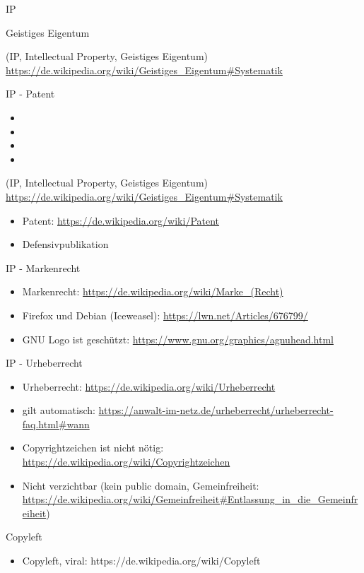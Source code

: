 \begin{frame}{IP}
	\begin{center}
		Geistiges Eigentum
	\end{center}
\end{frame}
\note
{
	(IP, Intellectual Property, Geistiges Eigentum) \url{https://de.wikipedia.org/wiki/Geistiges\_Eigentum\#Systematik}
}


\begin{frame}{IP - Patent}
	\begin{itemize}
		\item {}
		\item {}
		\item {}
		\item {}
	\end{itemize}
\end{frame}
\note
{
	(IP, Intellectual Property, Geistiges Eigentum) \url{https://de.wikipedia.org/wiki/Geistiges\_Eigentum\#Systematik}
	\begin{itemize}
		\item Patent: \url{https://de.wikipedia.org/wiki/Patent}
		\item Defensivpublikation
	\end{itemize}
}

\begin{frame}{IP - Markenrecht}
\end{frame}
\note
{
	\begin{itemize}
		\item Markenrecht: \url{https://de.wikipedia.org/wiki/Marke_(Recht)}
		\item Firefox und Debian (Iceweasel): \url{https://lwn.net/Articles/676799/}
		\item GNU Logo ist geschützt: \url{https://www.gnu.org/graphics/agnuhead.html}
	\end{itemize}
}

\begin{frame}{IP - Urheberrecht}
	\\
\end{frame}
\note
{
	\begin{itemize}
		\item Urheberrecht: \url{https://de.wikipedia.org/wiki/Urheberrecht}
		\item gilt automatisch: \url{https://anwalt-im-netz.de/urheberrecht/urheberrecht-faq.html\#wann}
		\item Copyrightzeichen ist nicht nötig: \url{https://de.wikipedia.org/wiki/Copyrightzeichen}
		\item Nicht verzichtbar (kein public domain, Gemeinfreiheit: \url{https://de.wikipedia.org/wiki/Gemeinfreiheit\#Entlassung\_in\_die\_Gemeinfreiheit})
	\end{itemize}
}


\begin{frame}{Copyleft}
	\\
\end{frame}
\note
{
	\begin{itemize}
		\item Copyleft, viral: https://de.wikipedia.org/wiki/Copyleft
	\end{itemize}
}


